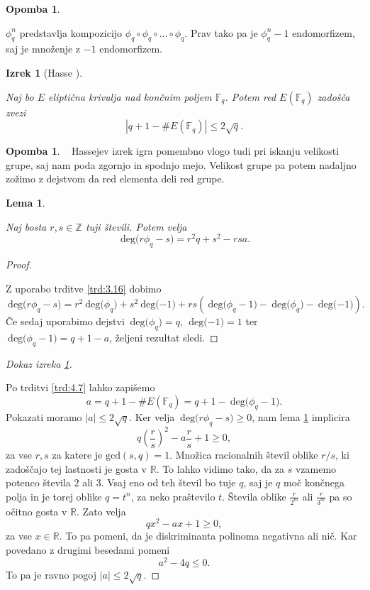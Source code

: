\documentclass[12pt,a4paper,twoside]{article}
\theoremstyle{definition} %
\newtheorem{opomba}[definicija]{Opomba}
\theoremstyle{plain} %
\newtheorem{lema}[definicija]{Lema}
\newtheorem{izrek}[definicija]{Izrek}
\numberwithin{equation}{section}  %
\newcommand{\R}{\mathbb R}
\newcommand{\Z}{\mathbb Z}
\newcommand{\F}{\mathbb F}
\newcommand{\E}[1]{E({#1})}
\newcommand{\DEG}[1]{\ \text{deg(}{#1}\text{)}}
\begin{document}
\begin{opomba}~

$\phi^n_q$ predstavlja kompozicijo $\phi_q \circ \phi_q \circ \ldots \circ \phi_q$. Prav tako pa je $\phi^n_q-1$ endomorfizem, saj je množenje z $-1$ endomorfizem.
\end{opomba}

\begin{izrek}[Hasse ]~

\label{izr:Hasse}
Naj bo $E$ eliptična krivulja nad končnim poljem $\F_q$.  Potem red $\E{\F_q}$ zadošča zvezi
$$|q+1-\#\E{\F_q}| \leq 2\sqrt{q}.$$
\end{izrek}

\begin{opomba}~
Hassejev izrek igra pomembno vlogo tudi pri iskanju velikosti grupe, saj nam poda zgornjo in spodnjo mejo. Velikost grupe pa potem nadaljno zožimo z dejstvom da red elementa deli red grupe. 
\end{opomba}

\begin{lema}~
\label{lema:hasse}

Naj bosta $r,s \in \Z$ tuji števili. Potem velja
$$\DEG{r\phi_q-s} = r^2q+s^2-rsa.$$
\end{lema}

\begin{proof}~

Z uporabo trditve \ref{trd:3.16} dobimo
$$\DEG{r\phi_q-s} = r^2\DEG{\phi_q}+s^2\DEG{-1}+rs(\DEG{\phi_q-1}-\DEG{\phi_q}-\DEG{-1}).$$
Če sedaj uporabimo dejstvi $\DEG{\phi_q} = q,\ \DEG{-1} = 1$ ter $\DEG{\phi_q-1} = q+1-a$, željeni rezultat sledi.
\end{proof}

\begin{proof}[Dokaz izreka \ref{izr:Hasse}]~

Po trditvi \ref{trd:4.7} lahko zapišemo
$$a=q+1-\#\E{\F_q} = q+1 -\DEG{\phi_q-1}.$$
Pokazati moramo $|a| \leq 2\sqrt{q}.$
Ker velja $\DEG{r\phi_q-s} \geq 0$, nam lema \ref{lema:hasse} implicira
$$q \left( \frac{r}{s} \right)^2-a\frac{r}{s}+1 \geq 0,$$
za vse $r,s$ za katere je $\text{gcd}(s,q)=1$. Množica racionalnih števil oblike $r/s$, ki zadoščajo tej lastnosti je gosta v $\R$. To lahko vidimo tako, da za $s$ vzamemo potenco števila $2$ ali $3$. Vsaj eno od teh števil bo tuje $q$, saj je $q$ moč končnega polja in je torej oblike $q = t^n$, za neko praštevilo $t$. Števila oblike $\frac{r}{2^m}$ ali $\frac{r}{3^m}$ pa so očitno gosta v $\R$. Zato velja
$$qx^2-ax + 1 \geq 0,$$
za vse $x\in \R$. To pa pomeni, da je diskriminanta polinoma negativna ali nič. Kar povedano z drugimi besedami pomeni
$$a^2-4q \leq 0.$$
To pa je ravno pogoj $|a|\leq 2\sqrt{q}$.


\end{proof}
\end{document}
